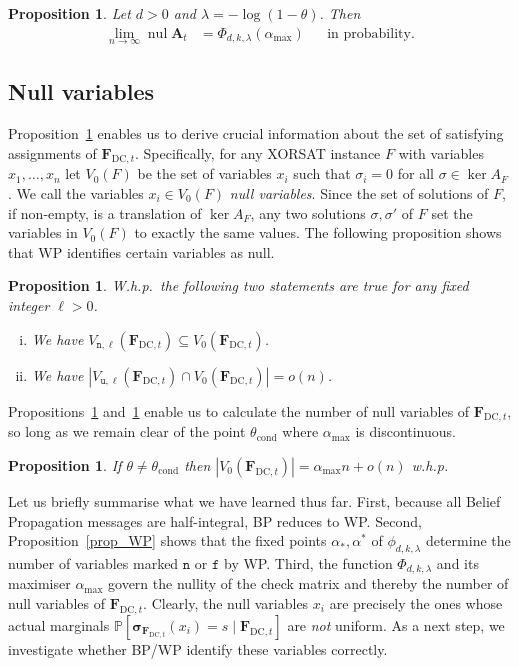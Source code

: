 \documentclass[10pt,reqno]{amsart}
\numberwithin{equation}{section}
\renewcommand{\vec}[1]{\boldsymbol{#1}}
\renewcommand{\subset}{\subseteq}
\newcommand{\FDC}[1]{\PHI_{\mathrm{DC},{#1}}}
\newcommand{\ADC}[1]{\vA_{#1}}
\newcommand{\amax}{\alpha_{\max}}
\newcommand{\tcond}{\theta_{\mathrm{cond}}}
\newcommand{\frz}{V_0}
\newcommand{\frozen}{\mathtt{f}}
\newcommand{\unfrozen}{\mathtt{u}}
\newcommand{\nll}{\mathtt{n}}
\newcommand{\fzn}{\frozen}
\newcommand{\uzn}{\unfrozen}
\newcommand\PHI{\vec F}
\newcommand\SIGMA{\vec\sigma}
\newcommand\vA{\vec A}
\newcommand\brk[1]{\left\lbrack{#1}\right\rbrack}
\newcommand{\Whp}{W.h.p.}
\newcommand{\whp}{w.h.p.}
\newcommand\pr{\mathbb{P}}
\newcommand\Prop{Proposition}
\newtheorem{proposition}[definition]{Proposition}
\DeclareMathOperator{\nul}{nul}
\def\pr{{\mathbb P}}
\newcommand{\ph}{\phi_{d,k,\lambda}}
\newcommand{\Ph}{\Phi_{d,k,\lambda}}
\begin{document}
\begin{proposition}\label{prop_nul}
	Let $d>0$ and $\lambda=-\log(1-\theta)$.
	Then
	\begin{align*}
		\lim_{n\to\infty}\nul\ADC{t}&=\Phi_{d,k,\lambda}(\amax)&&\mbox{in probability}.
	\end{align*}
\end{proposition}

\subsection{Null variables}\label{sec_frozen}
\Prop~\ref{prop_nul} enables us to derive crucial information about the set of satisfying assignments of $\FDC{t}$.
Specifically, for any XORSAT instance $F$ with variables $x_1,\ldots,x_n$ let $V_0(F)$ be the set of variables $x_i$ such that $\sigma_i=0$ for all $\sigma\in\ker A_F$.
We call the variables $x_i\in V_0(F)$ {\em null variables}.
Since the set of solutions of $F$, if non-empty, is a translation of $\ker A_F$, any two solutions $\sigma,\sigma'$ of $F$ set the variables in $V_0(F)$ to exactly the same values.
The following proposition shows that WP identifies certain variables as null.

\begin{proposition}\label{prop_nlluzn}
\Whp\ the following two statements are true for any fixed integer $\ell>0$.
	\begin{enumerate}[(i)]
		\item We have $V_{\nll,\ell}(\FDC t)\subset\frz(\FDC t)$.
		\item We have $|V_{\uzn,\ell}(\FDC{t})\cap\frz(\FDC{t})|=o(n)$.
	\end{enumerate}
\end{proposition}

\Prop s~\ref{prop_nul} and~\ref{prop_nlluzn} enable us to calculate the number of null variables of $\FDC{t}$, so long as we remain clear of the point $\tcond$ where $\amax$ is discontinuous.

\begin{proposition}\label{cor_frz}
	If $\theta\neq\tcond$ then $|\frz(\FDC{t})|=\amax n+o(n)$ \whp
\end{proposition}

Let us briefly summarise what we have learned thus far.
First, because all Belief Propagation messages are half-integral, BP reduces to WP.
Second, \Prop~\ref{prop_WP} shows that the fixed points $\alpha_*,\alpha^*$ of $\ph$ determine the number of variables marked $\nll$ or $\fzn$ by WP.
Third, the function $\Ph$ and its maximiser $\amax$ govern the nullity of the check matrix and thereby the number of null variables of $\FDC{t}$.
Clearly, the null variables $x_i$ are precisely the ones whose actual marginals $\pr\brk{\SIGMA_{\FDC t}(x_i)=s\mid\FDC{t}}$ are {\em not} uniform.
As a next step, we investigate whether BP/WP identify these variables correctly.
\end{document}
